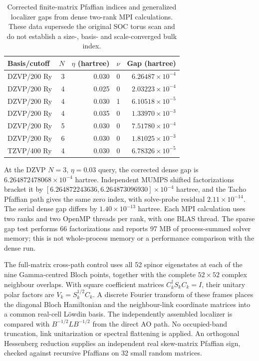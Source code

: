 \documentclass[11pt]{article}
\begin{document}
\begin{table}[htbp]
\centering\small
\begin{tabular}{lrrrr}
\toprule
Basis/cutoff & $N$ & $\eta$ (hartree) & $\nu$ & Gap (hartree)\\
\midrule
DZVP/200 Ry & 3 & 0.030 & 0 & $6.26487\times10^{-4}$\\
DZVP/200 Ry & 4 & 0.025 & 0 & $2.03223\times10^{-4}$\\
DZVP/200 Ry & 4 & 0.030 & 1 & $6.10518\times10^{-5}$\\
DZVP/200 Ry & 4 & 0.035 & 0 & $1.33970\times10^{-3}$\\
DZVP/200 Ry & 5 & 0.030 & 0 & $7.51780\times10^{-4}$\\
DZVP/200 Ry & 6 & 0.030 & 0 & $1.81025\times10^{-3}$\\
TZVP/400 Ry & 4 & 0.030 & 0 & $6.78326\times10^{-5}$\\
\bottomrule
\end{tabular}
\caption{Corrected finite-matrix Pfaffian indices and generalized
localizer gaps from dense two-rank MPI calculations. These data
supersede the original SOC torus scan and do not establish a
size-, basis- and scale-converged bulk index.}
\label{tab:si-stanene-localizer}
\end{table}

At the DZVP $N=3$, $\eta=0.03$ query, the corrected dense gap is
$6.264872478068\times10^{-4}$ hartree. Independent MUMPS shifted
factorizations bracket it by
$[6.264872243636,6.264873096930]\times10^{-4}$ hartree, and the
Tacho Pfaffian path gives the same zero index, with solve-probe residual
$2.11\times10^{-14}$. The serial dense gap differs by
$1.40\times10^{-13}$ hartree. Each MPI calculation uses two ranks
and two OpenMP threads per rank, with one BLAS thread.
The sparse gap test performs 66 factorizations and reports 97 MB
of process-summed solver memory; this is not whole-process memory
or a performance comparison with the dense run.

The full-matrix cross-path control uses all 52 spinor eigenstates
at each of the nine Gamma-centred Bloch points, together with the
complete $52\times52$ complex neighbour overlaps. With square
coefficient matrices $C_k^\dagger S_kC_k=I$, their unitary polar
factors are $V_k=S_k^{1/2}C_k$. A discrete Fourier transform of
these frames places the diagonal Bloch Hamiltonian and the
neighbour-link coordinate matrices into a common real-cell
L\"owdin basis. The independently assembled localizer is compared
with $B^{-1/2}LB^{-1/2}$ from the direct AO path. No occupied-band
truncation, link unitarization or spectral flattening is applied.
An orthogonal Hessenberg reduction supplies an independent real
skew-matrix Pfaffian sign, checked against recursive Pfaffians on
32 small random matrices.
\end{document}
